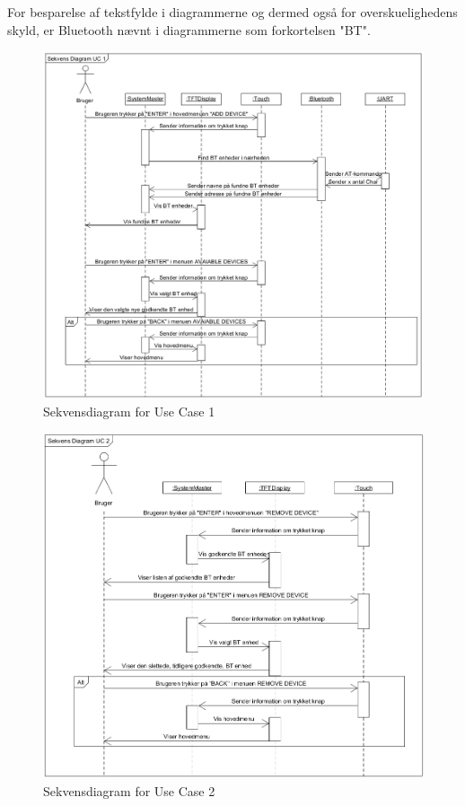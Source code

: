 For besparelse af tekstfylde i diagrammerne og dermed også for overskuelighedens skyld, er Bluetooth nævnt i diagrammerne som forkortelsen "BT".

\hfill \break
\hfill \break

\begin{figure}[H]
	\centering
	\includegraphics[width = 400 pt]{Img/SD1.png}
	\caption{Sekvensdiagram for Use Case 1}
	\label{fig:SD1}
\end{figure}

\hfill \break
\hfill \break
\hfill \break
\hfill \break
\hfill \break
\hfill \break
\hfill \break

\begin{figure}[H]
	\centering
	\includegraphics[width = 400 pt]{Img/SD2.png}
	\caption{Sekvensdiagram for Use Case 2}
	\label{fig:SD2}
\end{figure}

